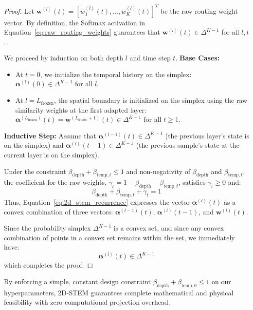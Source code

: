 \begin{proof}
Let $\mathbf{w}^{(l)}(t) = [w_1^{(l)}(t), \dots, w_K^{(l)}(t)]^T$ be the raw routing weight vector. By definition, the Softmax activation in Equation~\ref{eq:raw_routing_weights} guarantees that $\mathbf{w}^{(l)}(t) \in \Delta^{K-1}$ for all $l, t$.

We proceed by induction on both depth $l$ and time step $t$.
\textbf{Base Cases:}
\begin{itemize}
    \item At $t=0$, we initialize the temporal history on the simplex: $\boldsymbol{\alpha}^{(l)}(0) \in \Delta^{K-1}$ for all $l$.
    \item At $l = L_{\text{frozen}}$, the spatial boundary is initialized on the simplex using the raw similarity weights at the first adapted layer: $\boldsymbol{\alpha}^{(L_{\text{frozen}})}(t) = \mathbf{w}^{(L_{\text{frozen}}+1)}(t) \in \Delta^{K-1}$ for all $t \ge 1$.
\end{itemize}

\textbf{Inductive Step:}
Assume that $\boldsymbol{\alpha}^{(l-1)}(t) \in \Delta^{K-1}$ (the previous layer's state is on the simplex) and $\boldsymbol{\alpha}^{(l)}(t-1) \in \Delta^{K-1}$ (the previous sample's state at the current layer is on the simplex).

Under the constraint $\beta_{\text{depth}} + \beta_{\text{temp}, t} \le 1$ and non-negativity of $\beta_{\text{depth}}$ and $\beta_{\text{temp}, t}$, the coefficient for the raw weights, $\gamma_t = 1 - \beta_{\text{depth}} - \beta_{\text{temp}, t}$, satisfies $\gamma_t \ge 0$ and:
\begin{equation}
    \beta_{\text{depth}} + \beta_{\text{temp}, t} + \gamma_t = 1
\end{equation}
Thus, Equation~\ref{eq:2d_stem_recurrence} expresses the vector $\boldsymbol{\alpha}^{(l)}(t)$ as a convex combination of three vectors: $\boldsymbol{\alpha}^{(l-1)}(t)$, $\boldsymbol{\alpha}^{(l)}(t-1)$, and $\mathbf{w}^{(l)}(t)$.

Since the probability simplex $\Delta^{K-1}$ is a convex set, and since any convex combination of points in a convex set remains within the set, we immediately have:
\begin{equation}
    \boldsymbol{\alpha}^{(l)}(t) \in \Delta^{K-1}
\end{equation}
which completes the proof.
\end{proof}

By enforcing a simple, constant design constraint $\beta_{\text{depth}} + \beta_{\text{temp}, 0} \le 1$ on our hyperparameters, 2D-STEM guarantees complete mathematical and physical feasibility with zero computational projection overhead.

